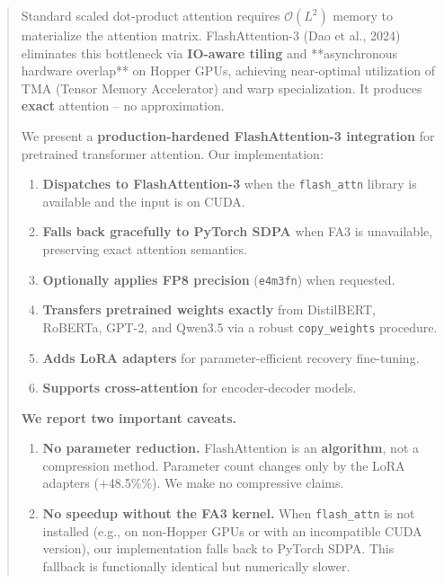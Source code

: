 \documentclass{article}
\begin{document}
\maketitle

\begin{abstract}
Standard scaled dot-product attention requires $\mathcal{O}(L^2)$ memory to 
materialize the attention matrix. FlashAttention-3 (Dao et al., 2024) 
eliminates this bottleneck via \textbf{IO-aware tiling} and **asynchronous 
hardware overlap** on Hopper GPUs, achieving near-optimal utilization of 
TMA (Tensor Memory Accelerator) and warp specialization. It produces 
\textbf{exact} attention -- no approximation.

We present a \textbf{production-hardened FlashAttention-3 integration} for 
pretrained transformer attention. Our implementation:

\begin{enumerate}
\item \textbf{Dispatches to FlashAttention-3} when the \texttt{flash\_attn} library is
  available and the input is on CUDA.
\item \textbf{Falls back gracefully to PyTorch SDPA} when FA3 is unavailable,
  preserving exact attention semantics.
\item \textbf{Optionally applies FP8 precision} (\texttt{e4m3fn}) when requested.
\item \textbf{Transfers pretrained weights exactly} from DistilBERT, RoBERTa,
  GPT-2, and Qwen3.5 via a robust \texttt{copy\_weights} procedure.
\item \textbf{Adds LoRA adapters} for parameter-efficient recovery fine-tuning.
\item \textbf{Supports cross-attention} for encoder-decoder models.

\end{enumerate}
\textbf{We report two important caveats.}

\begin{enumerate}
\item \textbf{No parameter reduction.} FlashAttention is an \textbf{algorithm}, not a
  compression method. Parameter count changes only by the LoRA adapters
  (+48.5\%\%). We make no compressive claims.
\item \textbf{No speedup without the FA3 kernel.} When \texttt{flash\_attn} is not installed
  (e.g., on non-Hopper GPUs or with an incompatible CUDA version), our
  implementation falls back to PyTorch SDPA. This fallback is functionally
  identical but numerically slower.


\end{enumerate}
\end{abstract}
\end{document}
